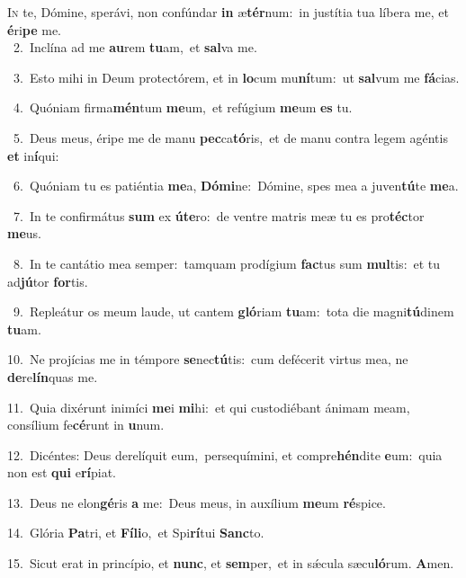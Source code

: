 \lettrine{\initial\textcolor{\initialcolor}{I}}{n} te, Dómine, sperávi, non confúndar \textbf{in} æ\-\textbf{tér}\-num:~\star in justítia tua líbera me, et \textbf{é}\-ri\textbf{pe} me.\\
{\numbfont\textcolor{\numbcolor}{~2.}}~Inclína ad me \textbf{au}\-rem \textbf{tu}\-am,~\star et \textbf{sal}\-va me.\par
{\numbfont\textcolor{\numbcolor}{~3.}}~Esto mihi in Deum protectórem, et in \textbf{lo}\-cum mu\-\textbf{ní}\-tum:~\star ut \textbf{sal}\-vum me \textbf{fá}\-cias.\par
{\numbfont\textcolor{\numbcolor}{~4.}}~Quóniam firma\-\textbf{mén}\-tum \textbf{me}\-um,~\star et refúgium \textbf{me}\-um \textbf{es} tu.\par
{\numbfont\textcolor{\numbcolor}{~5.}}~Deus meus, éripe me de manu \textbf{pec}\-ca\-\textbf{tó}\-ris,~\star et de manu contra legem agéntis \textbf{et} in\-\textbf{í}\-qui:\par
{\numbfont\textcolor{\numbcolor}{~6.}}~Quóniam tu es patiéntia \textbf{me}\-a, \textbf{Dó}\-\textbf{mi}ne:~\star Dómine, spes mea a juven\-\textbf{tú}\-te \textbf{me}\-a.\par
{\numbfont\textcolor{\numbcolor}{~7.}}~In te confirmátus \textbf{sum} ex \textbf{ú}\-\textbf{te}ro:~\star de ventre matris meæ tu es pro\-\textbf{téc}\-tor \textbf{me}\-us.\par
{\numbfont\textcolor{\numbcolor}{~8.}}~In te cantátio mea semper:~\dagger tamquam prodígium \textbf{fac}\-tus sum \textbf{mul}\-tis:~\star et tu ad\-\textbf{jú}\-tor \textbf{for}\-tis.\par
{\numbfont\textcolor{\numbcolor}{~9.}}~Repleátur os meum laude, ut cantem \textbf{gló}\-riam \textbf{tu}\-am:~\star tota die magni\-\textbf{tú}\-dinem \textbf{tu}\-am.\par
{\numbfont\textcolor{\numbcolor}{10.}}~Ne projícias me in témpore \textbf{se}\-nec\-\textbf{tú}\-tis:~\star cum defécerit virtus mea, ne \textbf{de}\-re\-\textbf{lín}\-quas me.\par
{\numbfont\textcolor{\numbcolor}{11.}}~Quia dixérunt inimíci \textbf{me}\-i \textbf{mi}\-hi:~\star et qui custodiébant ánimam meam, consílium fe\-\textbf{cé}\-runt in \textbf{u}\-num.\par
{\numbfont\textcolor{\numbcolor}{12.}}~Dicéntes: Deus derelíquit eum,~\dagger persequímini, et compre\-\textbf{hén}\-dite \textbf{e}\-um:~\star quia non est \textbf{qui} e\-\textbf{rí}\-piat.\par
{\numbfont\textcolor{\numbcolor}{13.}}~Deus ne elon\-\textbf{gé}\-ris \textbf{a} me:~\star Deus meus, in auxílium \textbf{me}\-um \textbf{ré}\-spice.\par
{\numbfont\textcolor{\numbcolor}{14.}}~Glória \textbf{Pa}\-tri, et \textbf{Fí}\-\textbf{li}o,~\star et Spi\-\textbf{rí}\-tui \textbf{Sanc}\-to.\par
{\numbfont\textcolor{\numbcolor}{15.}}~Sicut erat in princípio, et \textbf{nunc}\-, et \textbf{sem}\-per,~\star et in sǽcula sæcu\-\textbf{ló}\-rum. \textbf{A}\-men.\par
